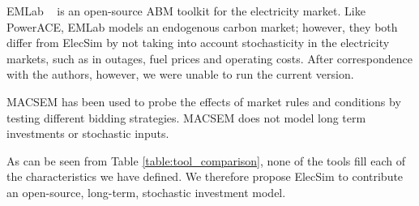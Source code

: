 EMLab ~\cite{Chappin2017} is an open-source ABM toolkit for the electricity market. Like PowerACE, EMLab models an endogenous carbon market; however, they both differ from ElecSim by not taking into account stochasticity in the electricity markets, such as in outages, fuel prices and operating costs. After correspondence with the authors, however, we were unable to run the current version.

MACSEM \cite{Praca2003} has been used to probe the effects of market rules and conditions by testing different bidding strategies. MACSEM does not model long term investments or stochastic inputs.


As can be seen from Table \ref{table:tool_comparison}, none of the tools fill each of the characteristics we have defined. We therefore propose ElecSim to contribute an open-source, long-term, stochastic investment model. 

